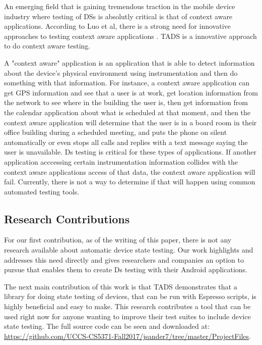 An emerging field that is gaining tremendous traction in the mobile device industry where testing of DSs is absolutly critical is that of context aware applications.
According to Luo et al, there is a strong need for innovative approaches to testing context aware applications \cite{Luo:2017:TLT:3139486.3130945}. TADS is a innovative approach to do context aware testing. 

A "context aware" application is an application that is able to detect information about the device's physical environment using instrumentation and then do something with that information.  For instance, a context aware application can get GPS information and see that a user is at work, get location information from the network to see where in the building the user is, then get information from the calendar application about what is scheduled at that moment, and then the context aware application will determine that the user is in a board room in their office building during a scheduled meeting, and puts the phone on silent automatically or even stops all calls and replies with a text message saying the user is unavailable. Ds testing is critical for these types of applications.  If another application acccessing certain instrumentation information collides with the context aware applications access of that data, the context aware application will fail. Currently, there is not a way to determine if that will happen using common automated testing tools. 

\subsection{Research Contributions}
For our first contribution, as of the writing of this paper, there is not any research available about automatic device state testing.  Our work highlights and addresses this need directly and gives researchers and companies an option to pursue that enables them to create Ds testing with their Android applications.

The next main contribution of this work is that TADS demonstrates that a library for doing state testing of devices, that can be run with Espresso scripts, is highly beneficial and easy to make.  This research contributes a tool that can be used right now for anyone wanting to improve their test suites to include device state testing. The full source code can be seen and downloaded at: \\ \url{https://github.com/UCCS-CS5371-Fall2017/jsander7/tree/master/ProjectFiles}.

